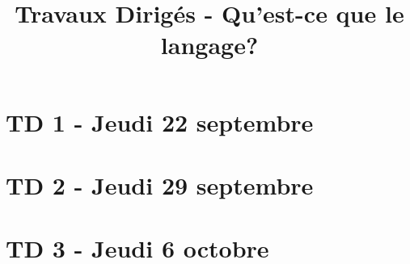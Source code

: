 \documentclass[a4paper,12pt]{article}
\begin{document}
\title{Travaux Dirigés - Qu'est-ce que le langage?}
\maketitle
\tableofcontents
\newpage
\section{TD 1 - Jeudi 22 septembre}

\newpage
\section{TD 2 - Jeudi 29 septembre}
\newpage
\section{TD 3 - Jeudi 6 octobre}

\end{document}
